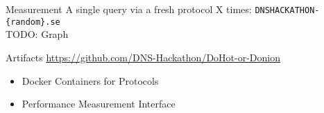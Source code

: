\documentclass[xcolor=x11names,dvipsnames,aspectratio=169]{beamer}
\begin{document}
    \begin{frame}{Measurement}
        A single query via a fresh protocol X times:
        \texttt{DNSHACKATHON-\{random\}.se}\\
        \vspace{2em}
        TODO: Graph
    \end{frame}

    \begin{frame}{Artifacts}
        \url{https://github.com/DNS-Hackathon/DoHot-or-Donion}
        \begin{itemize}
            \item Docker Containers for Protocols
            \item Performance Measurement Interface
        \end{itemize}
    \end{frame}
\end{document}
